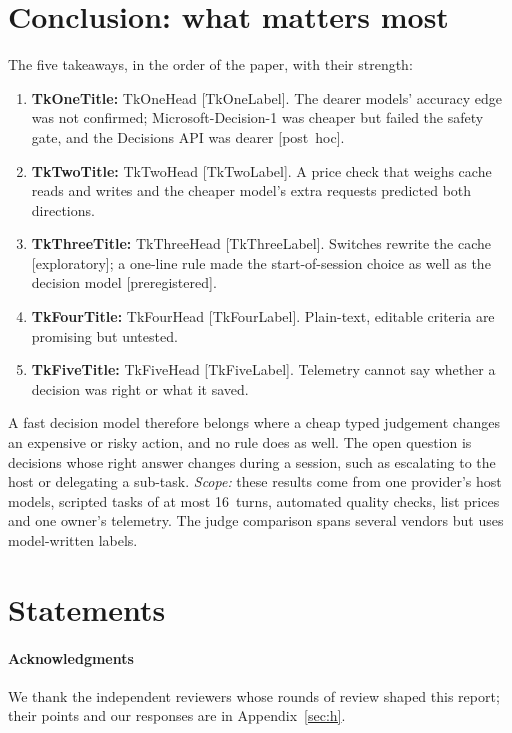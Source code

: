 \documentclass[11pt,letterpaper]{article}
\newcommand{\prereg}{\mbox{\textsf{\small\color{okblue}[preregistered]}}}
\newcommand{\posthoc}{\mbox{\textsf{\small\color{okgray}[post hoc]}}}
\newcommand{\expl}{\mbox{\textsf{\small\color{okgray}[exploratory]}}}
\newcommand{\TkTitle}[1]{\csname Tk#1Title\endcsname}
\newcommand{\TkHead}[1]{\csname Tk#1Head\endcsname}
\newcommand{\TkLabel}[1]{\textsf{\small\color{okblue!70!black}[\csname Tk#1Label\endcsname]}}
\newcommand{\MaxTurns}{16}
\newcommand{\StSec}[1]{Appendix~\ref{#1}}
\begin{document}
\section{Conclusion: what matters most}\label{sec:conclusion}

The five takeaways, in the order of the paper, with their strength:
\begin{enumerate}[leftmargin=1.6em]
  \item \textbf{\TkTitle{One}:} \TkHead{One} \TkLabel{One}. The dearer models' accuracy edge was not confirmed; Microsoft-Decision-1 was cheaper but failed the safety gate, and the Decisions API was dearer \posthoc.
  \item \textbf{\TkTitle{Two}:} \TkHead{Two} \TkLabel{Two}. A price check that weighs cache reads and writes and the cheaper model's extra requests predicted both directions.
  \item \textbf{\TkTitle{Three}:} \TkHead{Three} \TkLabel{Three}. Switches rewrite the cache \expl; a one-line rule made the start-of-session choice as well as the decision model \prereg.
  \item \textbf{\TkTitle{Four}:} \TkHead{Four} \TkLabel{Four}. Plain-text, editable criteria are promising but untested.
  \item \textbf{\TkTitle{Five}:} \TkHead{Five} \TkLabel{Five}. Telemetry cannot say whether a decision was right or what it saved.
\end{enumerate}
A fast decision model therefore belongs where a cheap typed judgement changes an expensive or risky action, and no
rule does as well. The open question is decisions whose right answer changes during a session, such as escalating to the
host or delegating a sub-task. \emph{Scope:} these results come from one provider's host models, scripted tasks of at
most \MaxTurns\ turns, automated quality checks, list prices and one owner's telemetry. The judge comparison spans
several vendors but uses model-written labels.
\section*{Statements}\label{sec:statements}

\paragraph{Acknowledgments} We thank the independent reviewers whose rounds of review shaped this report; their
points and our responses are in \StSec{sec:h}.
\end{document}
